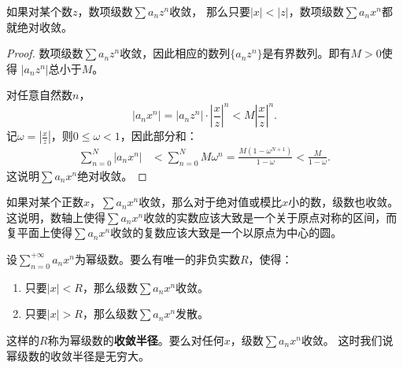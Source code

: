 \documentclass[12pt,UTF8,fontset=none]{ctexbook}
\begin{document}
\begin{tm}\label{tm:1-1-0}
    如果对某个数$z$，数项级数$\sum a_n z^n$收敛，
    那么只要$|x|<|z|$，数项级数$\sum a_n x^n$都就绝对收敛。
\end{tm}

\begin{proof}
    数项级数$\sum a_n z^n$收敛，因此相应的数列$\{a_n z^n\}$是有界数列。即有$M>0$使得
    $|a_n z^n|$总小于$M$。

    对任意自然数$n$，
    $$ |a_n x^n| = |a_n z^n| \cdot \left|\frac{x}{z}\right|^n < M \left|\frac{x}{z}\right|^n. $$
    记$\displaystyle \omega = \left|\frac{x}{z}\right|$，则$0\leqslant \omega<1$，因此部分和：
    \begin{align*}
        \sum_{n=0}^N |a_n x^n| &< \sum_{n=0}^N M \omega^n = \frac{M(1 - \omega^{N+1})}{1 - \omega} < \frac{M}{1 - \omega}.
    \end{align*}
    这说明$\sum a_n x^n$绝对收敛。

\end{proof}

如果对某个正数$x$，$\sum a_n x^n$收敛，那么对于绝对值或模比$x$小的数，级数也收敛。
这说明，数轴上使得$\sum a_n x^n$收敛的实数应该大致是一个关于原点对称的区间，而复平面上使得$\sum a_n x^n$收敛的复数应该大致是一个以原点为中心的圆。

\begin{tm}\label{tm:3-1-10}
    设$\displaystyle\sum_{n=0}^{+\infty} a_n x^n$为幂级数。要么有唯一的非负实数$R$，使得：
    \begin{enumerate}
        \item 只要$|x|<R$，那么级数$\sum a_n x^n$收敛。
        \item 只要$|x|>R$，那么级数$\sum a_n x^n$发散。
    \end{enumerate}
    这样的$R$称为幂级数的\textbf{收敛半径}。要么对任何$x$，级数$\sum a_n x^n$收敛。
    这时我们说幂级数的收敛半径是无穷大。
\end{tm}
\end{document}
